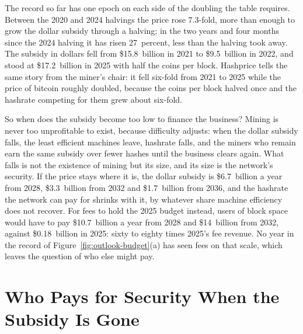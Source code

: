 The record so far has one epoch on each side of the doubling the table requires. Between the 2020 and 2024 halvings the price rose 7.3-fold, more than enough to grow the dollar subsidy through a halving; in the two years and four months since the 2024 halving it has risen 27~percent, less than the halving took away. %
The subsidy in dollars fell from \$15.8~billion in 2021 to \$9.5~billion in 2022, and stood at \$17.2~billion in 2025 with half the coins per block. %
Hashprice tells the same story from the miner's chair: it fell six-fold from 2021 to 2025 while the price of bitcoin roughly doubled, because the coins per block halved once and the hashrate competing for them grew about six-fold. %

So when does the subsidy become too low to finance the business? Mining is never too unprofitable to exist, because difficulty adjusts: when the dollar subsidy falls, the least efficient machines leave, hashrate falls, and the miners who remain earn the same subsidy over fewer hashes until the business clears again. What falls is not the existence of mining but its size, and its size is the network's security. If the price stays where it is, the dollar subsidy is \$6.7~billion a year from 2028, \$3.3~billion from 2032 and \$1.7~billion from 2036, and the hashrate the network can pay for shrinks with it, by whatever share machine efficiency does not recover. For fees to hold the 2025 budget instead, users of block space would have to pay \$10.7~billion a year from 2028 and \$14~billion from 2032, against \$0.18~billion in 2025: sixty to eighty times 2025's fee revenue. %
No year in the record of Figure~\ref{fig:outlook-budget}(a) has seen fees on that scale, which leaves the question of who else might pay.

\section{Who Pays for Security When the Subsidy Is Gone}
\label{sec:outlook-payers}

